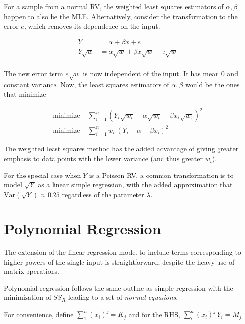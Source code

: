 For a sample from a normal RV, the weighted least squares estimators of $ \alpha, \beta $ happen to also be the MLE. Alternatively, consider the transformation to the error $ e $, which removes its dependence on the input.

\begin{align}
	Y &= \alpha + \beta x + e \nonumber \\
	Y \sqrt{w} &= \alpha \sqrt{w} + \beta x \sqrt{w} + e \sqrt{w}\nonumber \\
\end{align}

The new error term $ e \sqrt{w} $ is now independent of the input. It has mean $ 0 $ and constant variance. Now, the least squares estimators of $ \alpha, \beta $ would be the ones that minimize

\begin{align}
	\text{minimize } &\sum\limits_{i = 1}^{n} (Y_i \sqrt{w_i} - \alpha \sqrt{w_i} - \beta x_i \sqrt{w_i})^2 \nonumber \\
	\text{minimize } &\sum\limits_{i = 1}^{n} w_i\ (Y_i - \alpha - \beta x_i )^2 \nonumber
\end{align}

The weighted least squares method has the added advantage of giving greater emphasis to data points with the lower variance (and thus greater $ w_i $).

For the special case when $ Y $ is a Poisson RV, a common transformation is to model $ \sqrt{Y} $ as a linear simple regression, with the added approximation that $ \mathrm{Var}(\sqrt{Y}) \approx 0.25 $ regardless of the parameter $ \lambda $.

\section{Polynomial Regression}

The extension of the linear regression model to include terms corresponding to higher powers of the single input is straightforward, despite the heavy use of matrix operations.

Polynomial regression follows the same outline as simple regression with the minimization of $ SS_R $ leading to a set of \textit{normal equations}.

For convenience, define $ \sum_1^n (x_i)^{j} = K_j$ and for the RHS, $ \sum_i^n (x_i)^j\ Y_i = M_j $
 
